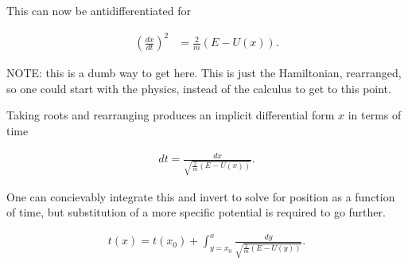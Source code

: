 This can now be antidifferentiated for

\begin{align}\label{eqn:1dpotentialIntegral:3}
\left( \frac{dx}{dt} \right)^2 &= \frac{2}{m} (E - U(x)).
\end{align}

NOTE: this is a dumb way to get here.  This is just the Hamiltonian, rearranged, so one could start with the physics, instead of the calculus to get to this point.

Taking roots and rearranging produces an implicit differential form $x$ in terms of time

\begin{align}\label{eqn:1dpotentialIntegral:4}
dt = \frac{dx}{\sqrt{ \frac{2}{m} (E - U(x)) } }.
\end{align}

One can concievably integrate this and invert to solve for position as a function of time, but substitution of a more specific potential is required to go further.

\begin{align}\label{eqn:1dpotentialIntegral:5}
t(x) = t(x_0) + \int_{y=x_0}^{x} \frac{dy}{\sqrt{ \frac{2}{m} (E - U(y)) } }.
\end{align}


\EndNoBibArticle
